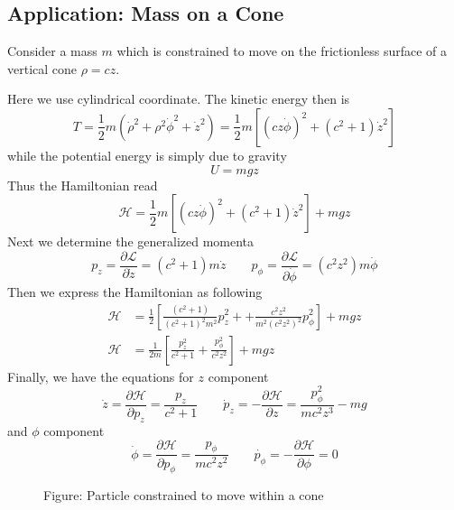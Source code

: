 \documentclass[../../../main.tex]{subfiles}
\begin{document}
\subsection*{Application: Mass on a Cone}
Consider a mass $m$ which is constrained to move on the frictionless surface of a vertical cone $\rho=cz$.

Here we use cylindrical coordinate. 
The kinetic energy then is 
\begin{equation*}
   T=\frac{1}{2}m\left(\dot{\rho}^2+\rho^2\dot{\phi}^2+\dot{z}^2\right)=\frac{1}{2}m\left[(cz\dot{\phi})^2+(c^2+1)\dot{z}^2\right]
\end{equation*}
while the potential energy is simply due to gravity
\begin{equation*}
    U=mgz
\end{equation*}
Thus the Hamiltonian read
\begin{equation*}
   \mathcal{H}=\frac{1}{2}m\left[(cz\dot{\phi})^2+(c^2+1)\dot{z}^2\right]+mgz
\end{equation*}
Next we determine the generalized momenta 
\begin{equation*}
   p_z=\frac{\partial\mathcal{L}}{\partial \dot{z}}=(c^2+1)m\dot{z}\qquad p_\phi=\frac{\partial\mathcal{L}}{\partial \dot{\phi}}=(c^2z^2)m\dot{\phi}
\end{equation*}
Then we express the Hamiltonian as following
\begin{align*}
   \mathcal{H}&=\frac{1}{2}\left[\frac{(c^2+1)}{(c^2+1)^2m^2}p_z^2++\frac{c^2z^2}{m^2(c^2z^2)^2}p_\phi^2\right]+mgz\\
   \mathcal{H}&=\frac{1}{2m}\left[\frac{p_z^2}{c^2+1}+\frac{p_\phi^2}{c^2z^2}\right]+mgz
\end{align*}
Finally, we have the equations for $z$ component
\begin{equation*}
   \dot{z}=\frac{\partial\mathcal{H}}{\partial p_z}=\frac{p_z}{c^2+1}\qquad \dot{p}_z=-\frac{\partial\mathcal{H}}{\partial z}=\frac{p_\phi^2}{mc^2z^3}-mg
\end{equation*}
and $\phi$ component
\begin{equation*}
   \dot{\phi}=\frac{\partial\mathcal{H}}{\partial p_\phi}=\frac{p_\phi}{mc^2z^2}\qquad \dot{p_\phi}=-\frac{\partial\mathcal{H}}{\partial \phi}=0
\end{equation*}


\begin{figure*}
	\centering
	\caption*{Figure: Particle constrained to move within a cone}
\end{figure*}
\end{document}
